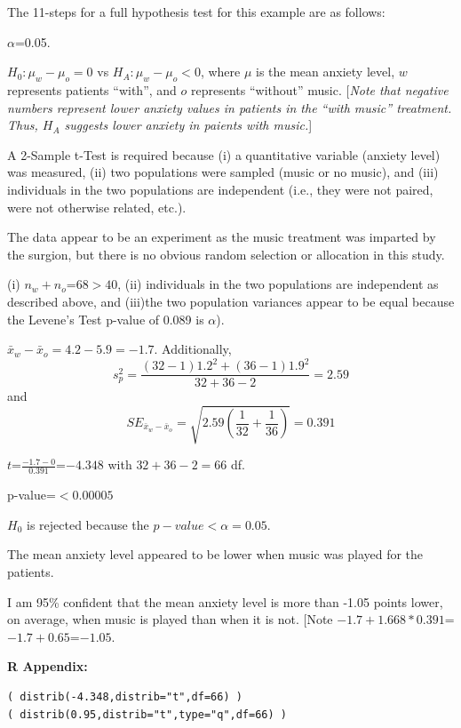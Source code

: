 \documentclass[10pt,openany]{book}\usepackage[]{graphicx}\usepackage[]{color}
\makeatletter
\newenvironment{kframe}{%
 \def\at@end@of@kframe{}%
 \ifinner\ifhmode%
  \def\at@end@of@kframe{\end{minipage}}%
  \begin{minipage}{\columnwidth}%
 \fi\fi%
 \def\FrameCommand##1{\hskip\@totalleftmargin \hskip-\fboxsep
 \colorbox{shadecolor}{##1}\hskip-\fboxsep
     \hskip-\linewidth \hskip-\@totalleftmargin \hskip\columnwidth}%
 \MakeFramed {\advance\hsize-\width
   \@totalleftmargin\z@ \linewidth\hsize
   \@setminipage}}%
 {\par\unskip\endMakeFramed%
 \at@end@of@kframe}
\newenvironment{knitrout}{}{} %
\makeatother
\begin{document}
The 11-steps  for a full hypothesis test for this example are as follows:
\vspace{-12pt}
  \begin{Enumerate}
    \item $\alpha$=0.05.
    \item $H_{0}:\mu_{w}-\mu_{o}=0$ vs $H_{A}:\mu_{w}-\mu_{o}<0$, where $\mu$ is the mean anxiety level, $w$ represents patients ``with'', and $o$ represents ``without'' music. [\textit{Note that negative numbers represent lower anxiety values in patients in the ``with music'' treatment. Thus, $H_{A}$ suggests lower anxiety in paients with music.}]
    \item A 2-Sample t-Test is required because (i) a quantitative variable (anxiety level) was measured, (ii) two populations were sampled (music or no music), and (iii) individuals in the two populations are independent (i.e., they were not paired, were not otherwise related, etc.).
    \item The data appear to be an experiment as the music treatment was imparted by the surgion, but there is no obvious random selection or allocation in this study.
    \item (i) $n_{w}+n_{o}$=68$>40$, (ii) individuals in the two populations are independent as described above, and (iii)the two population variances appear to be equal because the Levene's Test p-value of 0.089 is $\alpha$).
    \item $\bar{x}_{w}-\bar{x}_{o}$$=4.2-5.9$$=-1.7$. Additionally,
    \[s_{p}^{2}=\frac{(32-1)1.2^{2}+(36-1)1.9^{2}}{32+36-2} = 2.59 \]
and
    \[ SE_{\bar{x}_{w}-\bar{x}_{o}}=\sqrt{2.59\left(\frac{1}{32}+\frac{1}{36} \right)} = 0.391  \]
    \item $t$=$\frac{-1.7-0}{0.391}$=$-4.348$ with $32+36-2=66$ df.
    \item p-value=$<0.00005$
    \item $H_{0}$ is rejected because the $p-value <\alpha=0.05$.
    \item The mean anxiety level appeared to be lower when music was played for the patients.
    \item I am 95\% confident that the mean anxiety level is more than -1.05 points lower, on average, when music is played than when it is not. [Note $-1.7+1.668*0.391$=$-1.7+0.65$=$-1.05$.
  \end{Enumerate}

\vspace{-6pt}
\begin{minipage}{\textwidth}
\textbf{R Appendix:}
\vspace{-6pt}
\begin{knitrout}
\color{fgcolor}\begin{kframe}
\begin{verbatim}
( distrib(-4.348,distrib="t",df=66) )
( distrib(0.95,distrib="t",type="q",df=66) )
\end{verbatim}
\end{kframe}
\end{knitrout}
\end{minipage}
\end{document}
